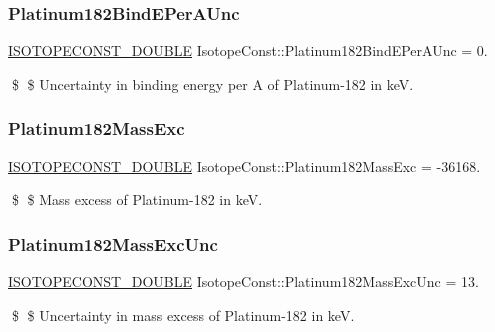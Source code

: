 \subsubsection{\texorpdfstring{Platinum182\+Bind\+E\+Per\+A\+Unc}{Platinum182BindEPerAUnc}}
{\footnotesize\ttfamily \mbox{\hyperlink{group___isotope_const-_macros_ga8f45a7272ce02c0b4c65c44636ed719a}{I\+S\+O\+T\+O\+P\+E\+C\+O\+N\+S\+T\+\_\+\+D\+O\+U\+B\+LE}} Isotope\+Const\+::\+Platinum182\+Bind\+E\+Per\+A\+Unc = 0.}

\$ \$ Uncertainty in binding energy per A of Platinum-\/182 in keV. \mbox{\label{group___isotope_const-_platinum-_pt182_ga5b686b8757c7a208b72df15780531f95}} 
\subsubsection{\texorpdfstring{Platinum182\+Mass\+Exc}{Platinum182MassExc}}
{\footnotesize\ttfamily \mbox{\hyperlink{group___isotope_const-_macros_ga8f45a7272ce02c0b4c65c44636ed719a}{I\+S\+O\+T\+O\+P\+E\+C\+O\+N\+S\+T\+\_\+\+D\+O\+U\+B\+LE}} Isotope\+Const\+::\+Platinum182\+Mass\+Exc = -\/36168.}

\$ \$ Mass excess of Platinum-\/182 in keV. \mbox{\label{group___isotope_const-_platinum-_pt182_gac2925db26f2eb1509c0f19479f447f98}} 
\subsubsection{\texorpdfstring{Platinum182\+Mass\+Exc\+Unc}{Platinum182MassExcUnc}}
{\footnotesize\ttfamily \mbox{\hyperlink{group___isotope_const-_macros_ga8f45a7272ce02c0b4c65c44636ed719a}{I\+S\+O\+T\+O\+P\+E\+C\+O\+N\+S\+T\+\_\+\+D\+O\+U\+B\+LE}} Isotope\+Const\+::\+Platinum182\+Mass\+Exc\+Unc = 13.}

\$ \$ Uncertainty in mass excess of Platinum-\/182 in keV. \mbox{\label{group___isotope_const-_platinum-_pt182_ga6bd480da03d992a17b9b78d0be4234d4}} 
